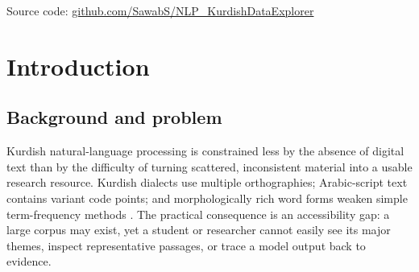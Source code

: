 \documentclass[11pt,a4paper]{article}
\newcommand{\githubicon}{\textcolor{Navy}{\faGithub}\hspace{0.35em}}
\begin{document}
\begin{titlepage}
\vfill
{\sffamily\small\color{Slate}
\githubicon Source code: \href{https://github.com/SawabS/NLP_KurdishDataExplorer}{github.com/SawabS/NLP\_KurdishDataExplorer}\par}
\end{titlepage}

\setcounter{page}{1}

\begin{abstract}
\noindent
Kurdish Data Explorer is a deployed, end-to-end artificial intelligence system
for turning a large, unlabelled Kurdish text corpus into navigable semantic
structure. The production corpus was gathered through the companion Bahdini
Crawler, normalized and sampled into 100,000 paragraphs, embedded with either
OpenAI \texttt{text-embedding-3-small} or NVIDIA
\texttt{nemotron-3-embed-1b}, and modeled with BERTopic. The resulting topic
hierarchy, semantic map, document review tools, search, and grounded question
answering are delivered through a React single-page application and FastAPI
service on Fly.io. On the identical sample, NVIDIA produced 32 topics with
99.448\% coverage and normalized pointwise mutual information (NPMI) coherence
of 0.0491 in 337.4 seconds; OpenAI produced 38 topics with 99.132\% coverage
and NPMI of 0.0374 in 3,628.7 seconds. NPMI measures how strongly a topic's top
words tend to occur together, with positive values indicating greater
coherence. The report documents the as-built system, evaluates its practical
trade-offs, and identifies corpus review, dialect-aware normalization, and
controlled human evaluation as the highest-priority next steps.
\end{abstract}

\clearpage
\tableofcontents
\listoffigures
\listoftables
\clearpage

\setcounter{page}{1}

\section{Introduction}

\subsection{Background and problem}

Kurdish natural-language processing is constrained less by the absence of
digital text than by the difficulty of turning scattered, inconsistent
material into a usable research resource. Kurdish dialects use multiple
orthographies; Arabic-script text contains variant code points; and
morphologically rich word forms weaken simple term-frequency methods
\parencite{azzat2023,ahmadi2020}. The practical consequence is an accessibility
gap: a large corpus may exist, yet a student or researcher cannot easily see
its major themes, inspect representative passages, or trace a model output back
to evidence.
\end{document}
